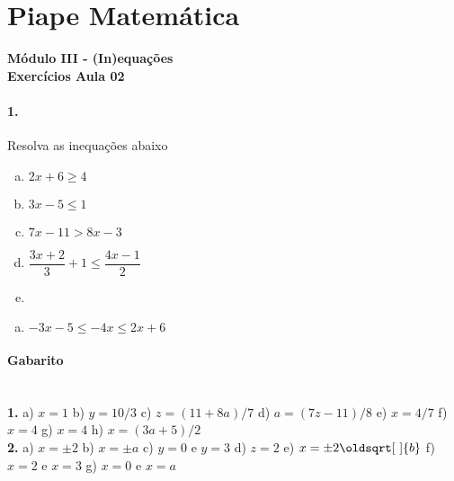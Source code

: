 \documentclass[a4paper,12pt]{article}
\renewcommand*{\sqrt}[2][\ ]{\oldsqrt[#1]{#2}}
\begin{document}
 
  
\section*{Piape Matemática} 
\textbf{Módulo III - (In)equações}\\
\textbf{Exercícios Aula 02}         
\begin{multicols}{2}
\paragraph*{1.} Resolva as inequações abaixo
\begin{enumerate}[a)]  
    \item $2x + 6 \ge 4$
    \item $3x - 5 \le 1$
    \item $7x - 11 > 8x - 3$
    \item $\dfrac{3x+2}{3} + 1 \le \dfrac{4x-1}{2}$
    \item 
\end{enumerate}

\begin{enumerate}[a)]
    \item $-3x -5 \le -4x \le 2x + 6$
    
\end{enumerate}

\vspace*{0cm}
\end{multicols}
 
\vspace*{\fill}
{\footnotesize
\paragraph*{Gabarito} \hspace*{\fill}\\
\textbf{1.}
 a) $x =1$ b) $y = 10/3$ c) $z= (11+8a)/7$ d) $a = (7z-11)/8$ e) $x = 4/7$ f) $x = 4$ g) $x = 4$ h) $x = (3a+5)/2$ \\
\textbf{2.}
a) $x = \pm 2$ b) $x = \pm a$ c) $y = 0$ e $y = 3$ d) $z = 2$ e) $x = \pm 2\sqrt{b}$ f) $x = 2$ e $x = 3$ g) $x = 0$ e $x = a$
}
\end{document}
